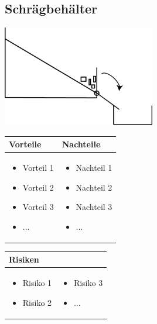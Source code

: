 \pagebreak


\subsection{Schrägbehälter}

\includegraphics[width=0.5\textwidth]{fig/Entladen_Schraegbehaelter.png}

\begin{table}[h]
\begin{tabular}{p{} | p{}}


 \textbf{Vorteile} & \textbf{Nachteile} \\ \hline
	 
\begin{itemize}
\item Vorteil 1
\item Vorteil 2
\item Vorteil 3
\item ...
\end{itemize}

 
 &
 
\begin{itemize}
\item Nachteil 1
\item Nachteil 2
\item Nachteil 3
\item ...
\end{itemize}

\end{tabular}
\end{table}

\begin{table}[h]
\begin{tabular}{p{}p{}}


 \textbf{Risiken} & \\ \hline
	 
\begin{itemize}
\item Risiko 1
\item Risiko 2
\end{itemize}
&
\begin{itemize}
\item Risiko 3
\item ...
\end{itemize}

 
\end{tabular}
\end{table}

\pagebreak